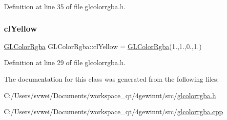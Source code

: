 Definition at line 35 of file glcolorrgba.\+h.

\mbox{\label{class_g_l_color_rgba_ab0516f94c60823f22b2c8caf1dbe76b6}} 
\subsubsection{\texorpdfstring{clYellow}{clYellow}}
{\footnotesize\ttfamily \mbox{\hyperlink{class_g_l_color_rgba}{G\+L\+Color\+Rgba}} G\+L\+Color\+Rgba\+::cl\+Yellow = \mbox{\hyperlink{class_g_l_color_rgba}{G\+L\+Color\+Rgba}}(1.,1.,0.,1.)\hspace{0.3cm}{\ttfamily [static]}}



Definition at line 29 of file glcolorrgba.\+h.



The documentation for this class was generated from the following files\+:\begin{DoxyCompactItemize}
\item 
C\+:/\+Users/svwei/\+Documents/workspace\+\_\+qt/4gewinnt/src/\mbox{\hyperlink{glcolorrgba_8h}{glcolorrgba.\+h}}\item 
C\+:/\+Users/svwei/\+Documents/workspace\+\_\+qt/4gewinnt/src/\mbox{\hyperlink{glcolorrgba_8cpp}{glcolorrgba.\+cpp}}\end{DoxyCompactItemize}
